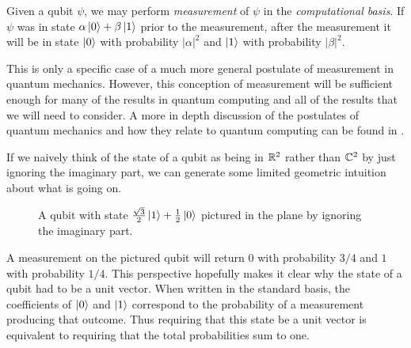          \begin{postulate}
             Given a qubit $\psi$, we may perform \emph{measurement} of $\psi$ in the \emph{computational basis}. 
             If $\psi$ was in state $\alpha \ket{0} + \beta \ket{1}$ prior to the measurement, after the 
             measurement it will be in state $\ket{0}$ with probability $|\alpha|^2$ and $ \ket{1}$ with 
             probability $|\beta|^2.$
     \end{postulate}

        This is only a specific case of a much more general postulate of measurement in quantum mechanics. However, 
        this conception of measurement will be sufficient enough for many of the results in quantum computing and 
        all of the results that we will need to consider. A more in depth discussion of the postulates of quantum 
        mechanics and how they relate to quantum computing can be found in \cite{Nielsen&Chuang}.
        
        If we naively think of the state of a qubit as being in $\mathbb{R}^2$ rather than $\mathbb{C}^2$ by just ignoring the 
        imaginary part, we can generate some limited geometric intuition about what is going on.


        \begin{figure}[ht]
            \centering
            \begin{center}
            \end{center}
            \caption{A qubit with state $\frac{\sqrt{3}}{2}\ket{1} + \frac{1}{2}\ket{0}$ pictured in the plane by 
            ignoring the imaginary part. }
    \end{figure}

    A measurement on the pictured qubit will return 0 with probability $3/4$ and $1$ with probability $1/4$. This 
    perspective hopefully makes it clear why the state of a qubit had to be a unit vector. When written in the 
    standard basis, the coefficients of $\ket{0}$ and $\ket{1}$ correspond to the probability of a measurement 
    producing that outcome. Thus requiring that this state be a unit vector is equivalent to requiring that the 
    total probabilities sum to one.


